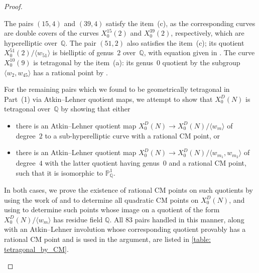 \documentclass[11pt,reqno]{amsart}
\newcommand{\Q}{\mathbb{Q}}
\theoremstyle{definition}
\begin{document}
\begin{proof}
\begin{enumerate}
    The pairs $(15,4)$ and $(39,4)$ satisfy the item~(c), as the corresponding curves are double covers of the curves $X_0^{15}(2)$ and $X_0^{39}(2)$, respectively, which are hyperelliptic over~$\Q$. The pair $(51,2)$ also satisfies the item~(c); its quotient $X_0^{51}(2)/\langle w_{51} \rangle$ is bielliptic of genus~$2$ over~$\Q$, with equation given in \cite{PS25b}. The curve $X_0^{10}(9)$ is tetragonal by the item~(a): its genus~$0$ quotient by the subgroup $\langle w_2, w_{45}\rangle$ has a rational point by \cite[Proposition~4.25]{NR15}.
    
    For the remaining pairs which we found to be geometrically tetragonal in Part~(1) via Atkin--Lehner quotient maps, we attempt to show that $X_0^D(N)$ is tetragonal over~$\Q$ by showing that either
    \begin{itemize}
        \item there is an Atkin--Lehner quotient map $X_0^D(N) \to X_0^D(N)/\langle w_m \rangle$ of  degree~$2$ to a sub-hyperelliptic curve with a rational CM point, or 
        \item there is an Atkin--Lehner quotient map $X_0^D(N) \to X_0^D(N)/\langle w_{m_1}, w_{m_2} \rangle$ of degree~$4$ with the latter quotient having genus~$0$ and a rational CM point, such that it is isomorphic to $\mathbb{P}^1_{\Q}$.
    \end{itemize}
    In both cases, we prove the existence of rational CM points on such quotients by using the work of \cite{GR06} and \cite{Saia24} to determine all quadratic CM points on $X_0^D(N)$, and using \cite[Corollary 5.14]{GR06} to determine such points whose image on a quotient of the form $X_0^D(N)/\langle w_m \rangle$ has residue field $\Q$. All $83$ pairs handled in this manner, along with an Atkin--Lehner involution whose corresponding quotient provably has a rational CM point and is used in the argument, are listed in \cref{table: tetragonal_by_CM}.
    

\end{enumerate}
\end{proof}
\end{document}
